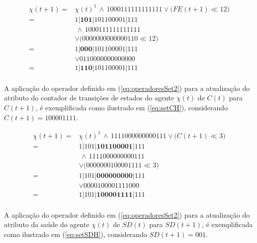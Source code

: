 \begin{equation}
 \begin{split}
 \chi(t + 1)   = & \chi(t)^1 \, \wedge \, 1000111111111111 \vee \big(FE(t + 1) \ll 12\big) \\
	       = & 1 | \boldsymbol{1 0 1} | 1 0 1 1 0 0 0 0 1 | 1 1 1 \\
	         & \, \wedge \, 1000111111111111 \\
	         & \vee \big(0000000000000110 \ll 12\big) \\
	       = & 1 | \boldsymbol{0 0 0} | 1 0 1 1 0 0 0 0 1 | 1 1 1 \\
	         & \vee 0110000000000000 \\
	       = & 1 | \boldsymbol{1 1 0} | 1 0 1 1 0 0 0 0 1 | 1 1 1 \\
 \label{eq:setFEH}
 \end{split}
\end{equation}

A aplicação do operador definido em (\ref{eq:operadoresSet2}) para a atualização do atributo do contador de transições de estados do agente $\chi(t)$ de $C(t)$ para $C(t + 1)$, é exemplificada como ilustrado em (\ref{eq:setCH}), considerando $C(t + 1) = 1 0 0 0 0 1 1 1 1$.

\begin{equation}
 \begin{split}
 \chi(t + 1)   = & \chi(t)^1 \, \wedge \, 1111000000000111 \vee \big(C(t + 1) \ll 3\big) \\
	       = & 1 | 1 0 1 | \boldsymbol{1 0 1 1 0 0 0 0 1} | 1 1 1 \\
	         & \, \wedge \, 1111000000000111 \\
	         & \vee \big(0000000100001111 \ll 3\big) \\
	       = & 1 | 1 0 1 | \boldsymbol{0 0 0 0 0 0 0 0 0} | 1 1 1 \\
	         & \vee 0000100001111000 \\
	       = & 1 | 1 0 1 | \boldsymbol{1 0 0 0 0 1 1 1 1} | 1 1 1 \\
 \label{eq:setCH}
 \end{split}
\end{equation}

A aplicação do operador definido em (\ref{eq:operadoresSet2}) para a atualização do atributo da saúde do agente $\chi(t)$ de $SD(t)$ para $SD(t + 1)$, é exemplificada como ilustrado em (\ref{eq:setSDH}), considerando $SD(t + 1) = 0 0 1$.

